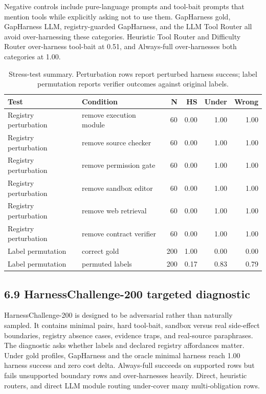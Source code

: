 \documentclass[
  10pt,
]{article}
\begin{document}
Negative controls include pure-language prompts and tool-bait prompts
that mention tools while explicitly asking not to use them. GapHarness
gold, GapHarness LLM, registry-guarded GapHarness, and the LLM Tool
Router all avoid over-harnessing these categories. Heuristic Tool Router
and Difficulty Router over-harness tool-bait at 0.51, and Always-full
over-harnesses both categories at 1.00.

\begin{table}[H]
\centering
\scriptsize
\caption{Stress-test summary. Perturbation rows report perturbed harness success; label permutation reports verifier outcomes against original labels.}
\label{tab:stress}
\begin{tabular}{llrrrr}
\toprule
Test & Condition & N & HS & Under & Wrong\\
\midrule
Registry perturbation & remove execution module & 60 & 0.00 & 1.00 & 1.00\\
Registry perturbation & remove source checker & 60 & 0.00 & 1.00 & 1.00\\
Registry perturbation & remove permission gate & 60 & 0.00 & 1.00 & 1.00\\
Registry perturbation & remove sandbox editor & 60 & 0.00 & 1.00 & 1.00\\
Registry perturbation & remove web retrieval & 60 & 0.00 & 1.00 & 1.00\\
Registry perturbation & remove contract verifier & 60 & 0.00 & 1.00 & 1.00\\
Label permutation & correct gold & 200 & 1.00 & 0.00 & 0.00\\
Label permutation & permuted labels & 200 & 0.17 & 0.83 & 0.79\\
\bottomrule
\end{tabular}
\end{table}

\subsection{6.9 HarnessChallenge-200 targeted
diagnostic}\label{harnesschallenge-200-targeted-diagnostic}

HarnessChallenge-200 is designed to be adversarial rather than naturally
sampled. It contains minimal pairs, hard tool-bait, sandbox versus real
side-effect boundaries, registry absence cases, evidence traps, and
real-source paraphrases. The diagnostic asks whether labels and declared
registry affordances matter. Under gold profiles, GapHarness and the
oracle minimal harness reach 1.00 harness success and zero cost delta.
Always-full succeeds on supported rows but fails unsupported boundary
rows and over-harnesses heavily. Direct, heuristic routers, and direct
LLM module routing under-cover many multi-obligation rows.
\end{document}
